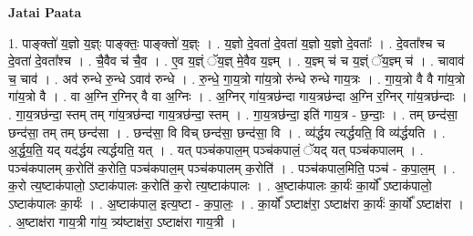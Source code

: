\documentclass[17pt]{extarticle}
\begin{document}
\textbf{Jatai Paata} \newline

1. पाङ्क्तो॑ य॒ज्ञो य॒ज्ञ्ः पाङ्क्तः॒ पाङ्क्तो॑ य॒ज्ञ्ः । . य॒ज्ञो दे॒वता॑ दे॒वता॑ य॒ज्ञो य॒ज्ञो दे॒वताः᳚ । . दे॒वता᳚श्च च दे॒वता॑ दे॒वता᳚श्च । . चै॒वैव च॑ चै॒व । . ए॒व य॒ज्ञ्ं ॅय॒ज्ञ् मे॒वैव य॒ज्ञ्म् । . य॒ज्ञ्म् च॑ च य॒ज्ञ्ं ॅय॒ज्ञ्म् च॑ । . चावाव॑ च॒ चाव॑ । . अव॑ रुन्धे रु॒न्धे ऽवाव॑ रुन्धे । . रु॒न्धे॒ गा॒य॒त्रो गा॑य॒त्रो रु॑न्धे रुन्धे गाय॒त्रः । . गा॒य॒त्रो वै वै गा॑य॒त्रो गा॑य॒त्रो वै । . वा अ॒ग्नि र॒ग्निर् वै वा अ॒ग्निः । . अ॒ग्निर् गा॑य॒त्रछ॑न्दा गाय॒त्रछ॑न्दा अ॒ग्नि र॒ग्निर् गा॑य॒त्रछ॑न्दाः । . गा॒य॒त्रछ॑न्दा॒ स्तम् तम् गा॑य॒त्रछ॑न्दा गाय॒त्रछ॑न्दा॒ स्तम् । . गा॒य॒त्रछ॑न्दा॒ इति॑ गाय॒त्र - छ॒न्दाः॒ । . तम् छन्द॑सा॒ छन्द॑सा॒ तम् तम् छन्द॑सा । . छन्द॑सा॒ वि विच् छन्द॑सा॒ छन्द॑सा॒ वि । . व्य॑र्द्धय त्यर्द्धयति॒ वि व्य॑र्द्धयति । . अ॒र्द्ध॒य॒ति॒ यद् यद॑र्द्धय त्यर्द्धयति॒ यत् । . यत् पञ्च॑कपाल॒म् पञ्च॑कपालं॒ ॅयद् यत् पञ्च॑कपालम् । . पञ्च॑कपालम् क॒रोति॑ क॒रोति॒ पञ्च॑कपाल॒म् पञ्च॑कपालम् क॒रोति॑ । . पञ्च॑कपाल॒मिति॒ पञ्च॑ - क॒पा॒ल॒म् । . क॒रो त्य॒ष्टाक॑पालो॒ ऽष्टाक॑पालः क॒रोति॑ क॒रो त्य॒ष्टाक॑पालः । . अ॒ष्टाक॑पालः का॒र्यः॑ का॒र्यो᳚ ऽष्टाक॑पालो॒ ऽष्टाक॑पालः का॒र्यः॑ । . अ॒ष्टाक॑पाल॒ इत्य॒ष्टा - क॒पा॒लः॒ । . का॒र्यो᳚ ऽष्टाक्ष॑रा॒ ऽष्टाक्ष॑रा का॒र्यः॑ का॒र्यो᳚ ऽष्टाक्ष॑रा । . अ॒ष्टाक्ष॑रा गाय॒त्री गा॑य॒ त्र्य॑ष्टाक्ष॑रा॒ ऽष्टाक्ष॑रा गाय॒त्री । \newline
\end{document}
